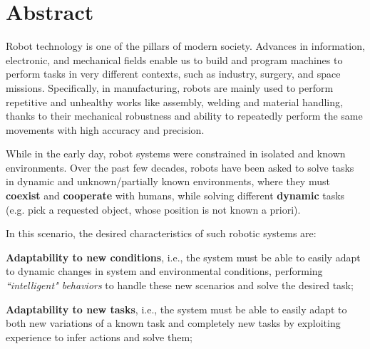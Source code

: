 \chapter*{Abstract}
\label{ch:abstract}
Robot technology is one of the pillars of modern society. Advances in information, electronic, and mechanical fields enable us to build and program machines to perform tasks in very different contexts, such as industry, surgery, and space missions.
\newline Specifically, in manufacturing, robots are mainly used to perform repetitive and unhealthy works like assembly, welding and material handling, thanks to their mechanical robustness and ability to repeatedly perform the same movements with high accuracy and precision.

While in the early day, robot systems were constrained in isolated and known environments. Over the past few decades, robots have been asked to solve tasks in dynamic and unknown/partially known environments, where they must \textbf{coexist} and \textbf{cooperate} with humans, while  solving different \textbf{dynamic} tasks \cite{bini2023multi} (e.g. pick a requested object, whose position is not known a priori). 

In this scenario, the desired characteristics of such robotic systems are:
\begin{enumerate*}[label=\textbf{(\alph*)}]
\item \textbf{Adaptability to new conditions}, i.e., the system must be able to easily adapt to dynamic changes in system and environmental conditions, performing \textit{``intelligent" behaviors} to handle these new scenarios and solve the desired task;
\item \textbf{Adaptability to new tasks}, i.e., the system must be able to easily adapt to both new variations of a known task and completely new tasks by exploiting experience to infer actions and solve them;
\end{enumerate*}

